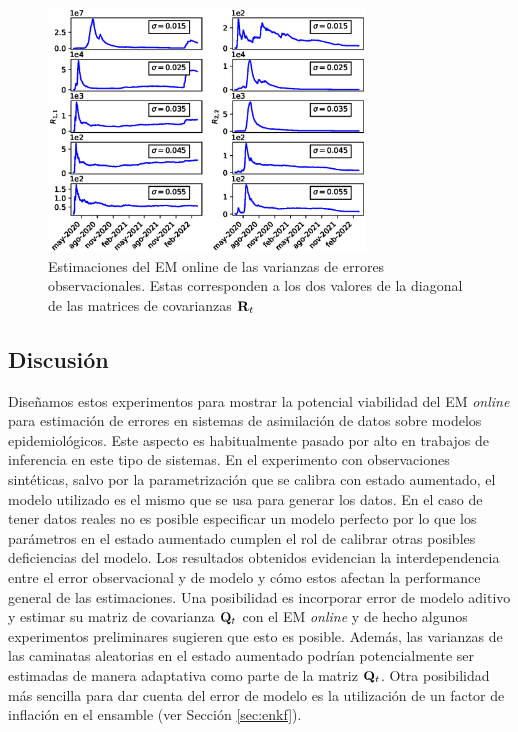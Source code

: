 \begin{figure}[h]
    \centering
    \includegraphics[width=0.75\textwidth]{figs/seird_online_em_aug_state_R_arg_data_sigmas.eps}
    \caption{Estimaciones del EM online de las varianzas de errores observacionales. Estas corresponden a los dos valores de la diagonal de las matrices de covarianzas $\mathbf{R}_t$}
    \label{fig:seird_R_arg_data}
\end{figure}

\subsection{Discusión}

Diseñamos estos experimentos para mostrar la potencial viabilidad del EM \textit{online} para estimación de errores en sistemas de asimilación de datos sobre modelos epidemiológicos. Este aspecto es habitualmente pasado por alto en trabajos de inferencia en este tipo de sistemas. En el experimento con observaciones sintéticas, salvo por la parametrización que se calibra con estado aumentado, el modelo utilizado es el mismo que se usa para generar los datos. En el caso de tener datos reales no es posible especificar un modelo perfecto por lo que los parámetros en el estado aumentado cumplen el rol de calibrar otras posibles deficiencias del modelo. Los resultados obtenidos evidencian la interdependencia entre el error observacional y de modelo y cómo estos afectan la performance general de las estimaciones. Una posibilidad es incorporar error de modelo aditivo y estimar su matriz de covarianza $\mathbf{Q}_t$ con el EM \textit{online} y de hecho algunos experimentos preliminares sugieren que esto es posible. Además, las varianzas de las caminatas aleatorias en el estado aumentado podrían potencialmente ser estimadas de manera adaptativa como parte de la matriz $\mathbf{Q}_t$. Otra posibilidad más sencilla para dar cuenta del error de modelo es la utilización de un factor de inflación en el ensamble (ver Sección \ref{sec:enkf}).
